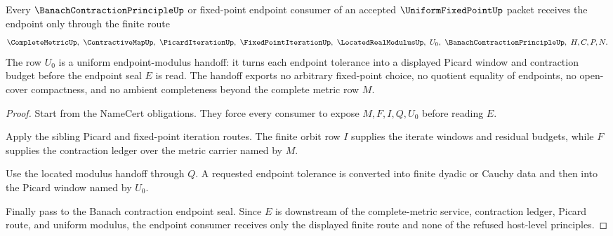 \begin{theorem}
\label{thm:uniform-fixed-point-modulus-handoff}
Every $\BanachContractionPrincipleUp$ or fixed-point endpoint consumer of an accepted $\UniformFixedPointUp$ packet receives the endpoint only through the finite route
$$
\CompleteMetricUp,\ \ContractiveMapUp,\ \PicardIterationUp,\ \FixedPointIterationUp,\ \LocatedRealModulusUp,\ U_0,\ \BanachContractionPrincipleUp,\ H,C,P,N .
$$
The row $U_0$ is a uniform endpoint-modulus handoff: it turns each endpoint tolerance into a displayed Picard window and contraction budget before the endpoint seal $E$ is read. The handoff exports no arbitrary fixed-point choice, no quotient equality of endpoints, no open-cover compactness, and no ambient completeness beyond the complete metric row $M$.
\end{theorem}
\begin{proof}
Start from the NameCert obligations. They force every consumer to expose $M,F,I,Q,U_0$ before reading $E$.

Apply the sibling Picard and fixed-point iteration routes. The finite orbit row $I$ supplies the iterate windows and residual budgets, while $F$ supplies the contraction ledger over the metric carrier named by $M$.

Use the located modulus handoff through $Q$. A requested endpoint tolerance is converted into finite dyadic or Cauchy data and then into the Picard window named by $U_0$.

Finally pass to the Banach contraction endpoint seal. Since $E$ is downstream of the complete-metric service, contraction ledger, Picard route, and uniform modulus, the endpoint consumer receives only the displayed finite route and none of the refused host-level principles.
\end{proof}


\begin{closurestatus}{\UniformFixedPointUp}
  \theoryclosure{\seedClosure}
  \formalstatus{\unformalizedV}
\end{closurestatus}
